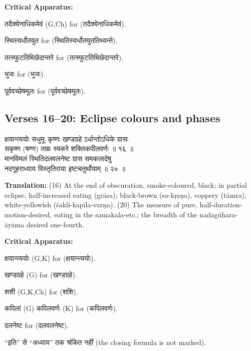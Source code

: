 \documentclass[11pt,a4paper]{article}
\newcommand{\dev}[1]{{\devanagarifont #1}}
\newcommand{\sanskritcol}[1]{%
  \begin{minipage}[t]{0.47\textwidth}
  \vspace{0pt}
  \begin{flushleft}
  #1
  \end{flushleft}
  \end{minipage}%
  \hfill
}
\newcommand{\englishcol}[1]{%
  \begin{minipage}[t]{0.47\textwidth}
  \vspace{0pt}
  \begin{flushleft}
  #1
  \end{flushleft}
  \end{minipage}%
}
\newenvironment{variants}{%
  \small%
  \color{varecolor}%
  \list{}{\leftmargin=2em\itemindent=-1em}%
}{\endlist}
\begin{document}
\vspace{0.4cm}
\textcolor{varecolor}{\textbf{Critical Apparatus:}}
\begin{variants}
\item[14.1] \dev{तदैक्येनाधिकमेवं} (G,Ch) \dev{for} (\dev{तदैक्येनाधिकमेवं}).
\item[16.1] \dev{स्थिस्यर्धोतयुत} \dev{for} (\dev{स्थितिस्यर्धोतयुततिथ्यन्ते}).
\item[17.1] \dev{तत्स्फुटतिथिछेदान्तरे} \dev{for} (\dev{तत्स्फुटतिथिछेदान्तरे}).
\item[18.1] \dev{भुजः} \dev{for} (\dev{भुजः}).
\item[18.2] \dev{पूर्ववच्छेषमूलः} \dev{for} (\dev{पूर्ववच्छेषमूलः}).
\end{variants}

\subsection*{Verses 16--20: Eclipse colours and phases}

\noindent
\sanskritcol{\dev{क्षयान्त्ययोः सधुमूः कृष्णः खण्डग्रहे ऽर्धान्तोऽधिके ग्रासः} \\ \dev{सकृष्ण (षण्ण) ताम्रः स्वकरे शक्लिकपीलवर्णः ॥ १६ ॥} \\[0.2cm]
\dev{मानविमलं स्थितिदलवलनेष्ट ग्रास समकलादेषु} \\ \dev{नदगूहराध्याय विस्तृतिराया इष्टचतुर्थोयाम् ॥ २० ॥}}
\englishcol{\textbf{Translation:} (16) At the end of obscuration, smoke-coloured, black; in partial
eclipse, half-increased eating (grāsa); black-brown (sa-kṛṣṇa), coppery (tāmra),
white-yellowish (śakli-kapīla-varṇa). (20) The measure of pure, half-duration-motion-desired,
eating in the samakala-etc.; the breadth of the nadagūhara-āyāma desired one-fourth.}

\vspace{0.4cm}
\textcolor{varecolor}{\textbf{Critical Apparatus:}}
\begin{variants}
\item[16.1] \dev{क्षयान्त्ययोः} (G,K) \dev{for} (\dev{क्षयान्त्ययोः}).
\item[16.2] \dev{खण्डग्रहे} (G) \dev{for} (\dev{खण्डग्रहे}).
\item[16.3] \dev{शशी} (G,K,Ch) \dev{for} (\dev{शशि}).
\item[16.4] \dev{कपिलां} (G) \dev{कपिलवर्णः} (K) \dev{for} (\dev{कपिलवर्णः}).
\item[20.1] \dev{दलनेष्ट} \dev{for} (\dev{दलवलनेष्ट}).
\item[\dev{वि०}] \dev{``इति'' से ``अध्याय'' तक श्रंकित नहीं} (the closing formula is not marked).
\end{variants}
\end{document}
